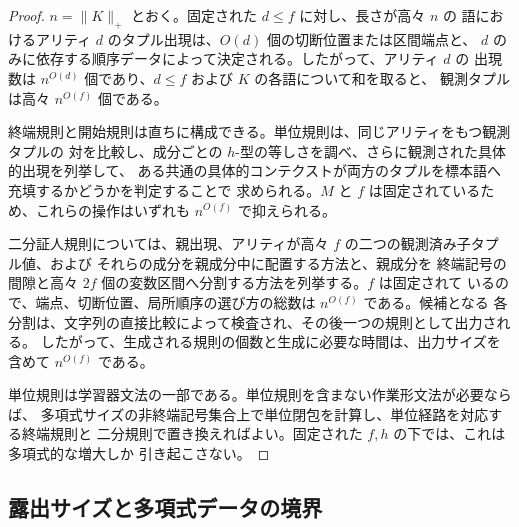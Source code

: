 \documentclass[11pt,a4paper]{ltjsarticle}
\theoremstyle{remark}
\begin{document}
\begin{proof}
\(n=\|K\|_+\) とおく。固定された \(d\le f\) に対し、長さが高々 \(n\) の
語におけるアリティ \(d\) のタプル出現は、\(O(d)\) 個の切断位置または区間端点と、
\(d\) のみに依存する順序データによって決定される。したがって、アリティ \(d\) の
出現数は \(n^{O(d)}\) 個であり、\(d\le f\) および \(K\) の各語について和を取ると、
観測タプルは高々 \(n^{O(f)}\) 個である。

終端規則と開始規則は直ちに構成できる。単位規則は、同じアリティをもつ観測タプルの
対を比較し、成分ごとの \(h\)-型の等しさを調べ、さらに観測された具体的出現を列挙して、
ある共通の具体的コンテクストが両方のタプルを標本語へ充填するかどうかを判定することで
求められる。\(M\) と \(f\) は固定されているため、これらの操作はいずれも
\(n^{O(f)}\) で抑えられる。

二分証人規則については、親出現、アリティが高々 \(f\) の二つの観測済み子タプル値、および
それらの成分を親成分中に配置する方法と、親成分を
終端記号の間隙と高々 \(2f\) 個の変数区間へ分割する方法を列挙する。\(f\) は固定されて
いるので、端点、切断位置、局所順序の選び方の総数は \(n^{O(f)}\) である。候補となる
各分割は、文字列の直接比較によって検査され、その後一つの規則として出力される。
したがって、生成される規則の個数と生成に必要な時間は、出力サイズを含めて
\(n^{O(f)}\) である。

単位規則は学習器文法の一部である。単位規則を含まない作業形文法が必要ならば、
多項式サイズの非終端記号集合上で単位閉包を計算し、単位経路を対応する終端規則と
二分規則で置き換えればよい。固定された \(f,h\) の下では、これは多項式的な増大しか
引き起こさない。
\end{proof}


\subsection{露出サイズと多項式データの境界}
\label{subsec:exposure-boundary}
\end{document}

